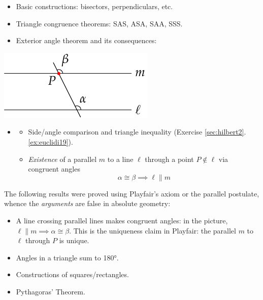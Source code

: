 \begin{minipage}[t]{0.7\linewidth}\vspace{-2pt}
	\begin{itemize}\itemsep2pt
	  \item Basic constructions: bisectors, perpendiculars, etc.
	  \item Triangle congruence theorems: SAS, ASA, SAA, SSS.
	  \item Exterior angle theorem and its consequences:
 	\end{itemize}
\end{minipage}
\hfill
\begin{minipage}[t]{0.29\linewidth}\vspace{-7pt}
	\flushright\includegraphics[scale=0.95]{history-playfair}
\end{minipage}\par
\vspace{-6pt}
\begin{itemize}\itemsep2pt
	\item[]\begin{itemize}
	  \item Side/angle comparison and triangle inequality (Exercise \ref*{sec:hilbert2}.\ref{ex:euclidi19}).
	  \item \emph{Existence} of a parallel $m$ to a line $\ell$ through a point $P\not\in\ell$ via congruent angles
	  \[
	  	\alpha\cong\beta\implies \ell\parallel m
	  \]
	\end{itemize}
\end{itemize}



\label{pg:absolute}

The following results were proved using Playfair's axiom or the parallel postulate, whence the \emph{arguments} are false in absolute geometry:
\begin{itemize}\itemsep2pt
  \item A line crossing parallel lines makes congruent angles: in the picture,  $\ell\parallel m\implies \alpha\cong\beta$. This is the uniqueness claim in Playfair: the parallel $m$ to $\ell$ through $P$ is unique.
  \item Angles in a triangle sum to \ang{180}.
  \item Constructions of squares/rectangles.
  \item Pythagoras' Theorem.
\end{itemize}


